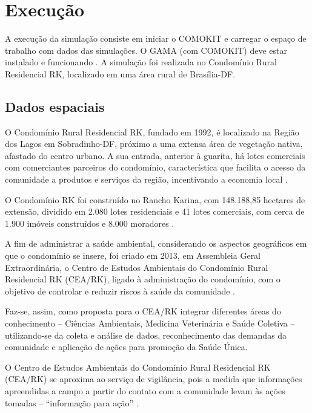 \section{Execução}

A execução da simulação consiste em iniciar o COMOKIT e carregar o espaço de trabalho com dados das simulações. O GAMA (com COMOKIT) deve estar instalado e funcionando \cite{ComokitDoc}. A simulação foi realizada no Condomínio Rural Residencial RK, localizado em uma área rural de Brasília-DF.


\subsection{Dados espaciais}

O Condomínio Rural Residencial RK, fundado em 1992, é localizado na Região dos Lagos em Sobradinho-DF, próximo a uma extensa área de vegetação nativa, afastado do centro urbano. A sua entrada, anterior à guarita, há lotes comerciais com comerciantes parceiros do condomínio, característica que facilita o acesso da comunidade a produtos e serviços da região, incentivando a economia local \cite{CondominioRK:online}.

O Condomínio RK foi construído no Rancho Karina, com 148.188,85 hectares de extensão, dividido em 2.080 lotes residenciais e 41 lotes comerciais, com cerca de 1.900 imóveis construídos e 8.000 moradores \cite{CondominioRK:online}.

A fim de administrar a saúde ambiental, considerando os aspectos geográficos em que o condomínio se insere, foi criado em 2013, em Assembleia Geral Extraordinária, o Centro de Estudos Ambientais do Condomínio Rural Residencial RK (CEA/RK), ligado à administração do condomínio, com o objetivo de controlar e reduzir riscos à saúde da comunidade \cite{CondominioRK:online}.

Faz-se, assim, como proposta para o CEA/RK integrar diferentes áreas do conhecimento – Ciências Ambientais, Medicina Veterinária e Saúde Coletiva – utilizando-se da coleta e análise de dados, reconhecimento das demandas da comunidade e aplicação de ações para promoção da Saúde Única. \cite{miranda2020acompanhamento}

O Centro de Estudos Ambientais do Condomínio Rural Residencial RK (CEA/RK) se aproxima ao serviço de vigilância, pois a medida que informações apreendidas a campo a partir do contato com a comunidade levam às ações tomadas – “informação para ação” \cite{wunsch1993sistema}.

